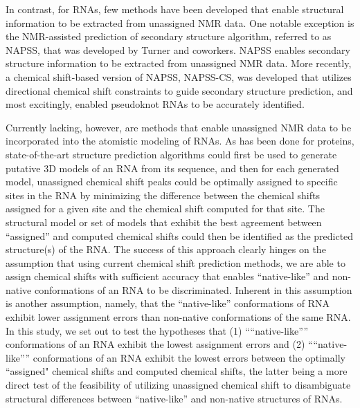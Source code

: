 \documentclass[journal=jcisd8,manuscript=article,layout=onecolumn]{achemso}
\begin{document}
In contrast, for RNAs, few methods have been developed that enable structural information to be extracted from unassigned NMR data. One notable exception is the NMR-assisted prediction of secondary structure algorithm, referred to as NAPSS, that was  developed by Turner and coworkers. NAPSS enables secondary structure information to be extracted from unassigned NMR data\cite{hart2008nmr}. More recently, a chemical shift-based version of NAPSS, NAPSS-CS, was developed that utilizes directional chemical shift constraints to guide secondary structure prediction, and most excitingly, enabled pseudoknot RNAs to be accurately identified\cite{chen2015nuclear}. 

Currently lacking, however, are methods that enable unassigned NMR data to be incorporated into the atomistic modeling of RNAs. As has been done for proteins, state-of-the-art structure prediction algorithms could first be used to generate putative 3D models of an RNA from its sequence, and then for each generated model, unassigned chemical shift peaks could be optimally assigned to specific sites in the RNA by minimizing the difference between the chemical shifts assigned for a given site and the chemical shift computed for that site. The structural model or set of models that exhibit the best agreement between ``assigned'' and computed chemical shifts could then be identified as the predicted structure(s) of the RNA\cite{meiler2003rapid, bermejo2008deuterated, courtney2015experimental}. The success of this approach clearly hinges on the assumption that using current chemical shift prediction methods, we are able to assign chemical shifts with sufficient accuracy that enables ``native-like'' and non-native conformations of an RNA to be discriminated. Inherent in this assumption is another assumption, namely, that the ``native-like'' conformations of RNA exhibit lower assignment errors than non-native conformations of the same RNA. In this study, we set out to test the hypotheses that (1) “``native-like''” conformations of an RNA exhibit the lowest assignment errors and (2)  “``native-like''” conformations of an RNA exhibit the lowest errors between the optimally ``assigned" chemical shifts and computed chemical shifts, the latter being a more direct test of the feasibility of utilizing unassigned chemical shift to disambiguate structural differences between ``native-like'' and non-native structures of RNAs.
\end{document}
